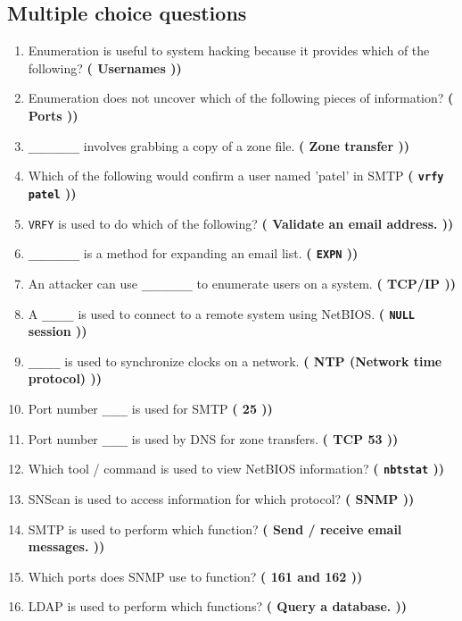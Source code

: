 \subsection{Multiple choice questions}
\begin{enumerate}
    \item Enumeration is useful to system hacking because it provides which of the following? \textbf{\left( Usernames \right))}
    \item Enumeration does not uncover which of the following pieces of information? \textbf{\left( Ports \right))}
    \item \verb|________| involves grabbing a copy of a zone file. \textbf{\left( Zone transfer \right))}
    \item Which of the following would confirm a user named 'patel' in SMTP \textbf{\left( \verb|vrfy patel| \right))}
    \item \verb|VRFY| is used to do which of the following? \textbf{\left( Validate an email address. \right))}
    \item \verb|________| is a method for expanding an email list. \textbf{\left( \verb|EXPN| \right))}
    \item An attacker can use \verb|________| to enumerate users on a system. \textbf{\left( TCP/IP \right))}
    \item A \verb|_____| is used to connect to a remote system using NetBIOS. \textbf{\left( \verb|NULL| session \right))}
    \item \verb|_____| is used to synchronize clocks on a network. \textbf{\left( NTP (Network time protocol) \right))}
    \item Port number \verb|____| is used for SMTP \textbf{\left(  25 \right))}
    \item Port number \verb|____| is used by DNS for zone transfers. \textbf{\left( TCP 53 \right))}
    \item Which tool / command is used to view NetBIOS information? \textbf{\left( \verb|nbtstat| \right))}
    \item SNScan is used to access information for which protocol? \textbf{\left( SNMP \right))}
    \item SMTP is used to perform which function? \textbf{\left( Send / receive email messages. \right))}
    \item Which ports does SNMP use to function? \textbf{\left( 161 and 162 \right))}
    \item LDAP is used to perform which functions? \textbf{\left( Query a database. \right))} 

\end{enumerate}
